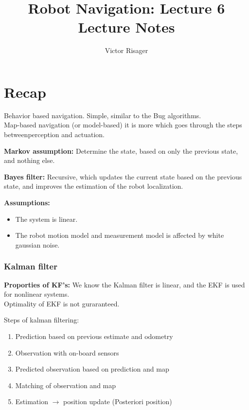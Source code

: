 \documentclass[a4paper]{article}
\title{Robot Navigation: Lecture 6 \\
	\large Lecture Notes}
\author{Victor Risager}
\begin{document}
\maketitle

\section{Recap}
Behavior based navigation. Simple, similar to the Bug algorithms. \\
Map-based navigation (or model-based) it is more which goes through the steps betweenperception and actuation. 

\vspace{5pt}

\textbf{Markov assumption:} Determine the state, based on only the previous state, and nothing else. 

\vspace{5pt}

\textbf{Bayes filter:} Recursive, which updates the current state based on the previous state, and improves the estimation of the robot localization. 

\vspace{5pt}

\textbf{Assumptions:} 
\begin{itemize}
	\item The system is linear.
	\item The robot motion model and measurement model is affected by white gaussian noise.
\end{itemize}

\subsubsection{Kalman filter}
\textbf{Proporties of KF's:} 
We know the Kalman filter is linear, and the EKF is used for nonlinear systems.\\
Optimality of EKF is not guraranteed.


Steps of kalman filtering:
\begin{enumerate}
	\item Prediction based on previous estimate and odometry
	\item Observation with on-board sensors
	\item Predicted observation based on prediction and map
	\item Matching of observation and map
	\item Estimation $\rightarrow$ position update (Posteriori position)
\end{enumerate}
\end{document}
